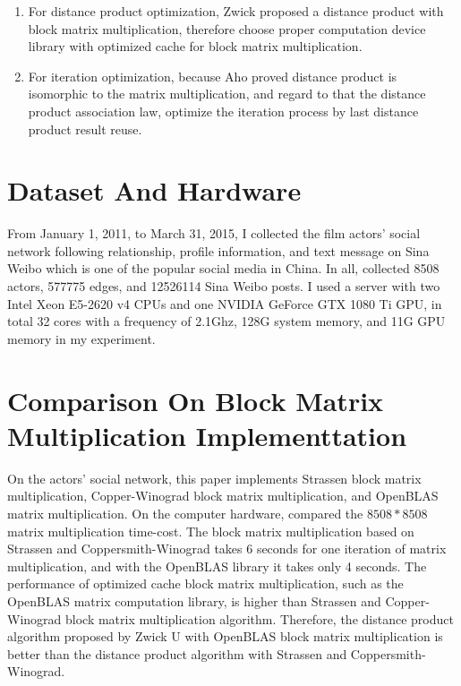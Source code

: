 \documentclass[review]{cvpr}
\begin{document}
\begin{enumerate}
\item For distance product optimization, Zwick proposed a distance product with block matrix multiplication, therefore choose proper computation device library with optimized cache for block matrix multiplication.
\item For iteration optimization, because Aho proved distance product is isomorphic to the matrix multiplication, and regard to that the distance product association law, optimize the iteration process by last distance product result reuse.
\end{enumerate}


\section{Dataset And Hardware}
From January 1, 2011, to March 31, 2015, I collected the film actors' social network following relationship, profile information, and text message on Sina Weibo which is one of the popular social media in China.
In all, collected 8508 actors, 577775 edges, and 12526114 Sina Weibo posts.
I used a server with two Intel Xeon E5-2620 v4 CPUs and one NVIDIA GeForce GTX 1080 Ti GPU, in total 32 cores with a frequency of 2.1Ghz, 128G system memory, and 11G GPU memory in my experiment.



\section{Comparison On Block Matrix Multiplication Implementtation}

On the actors' social network, this paper implements Strassen block matrix multiplication, Copper-Winograd block matrix multiplication, and OpenBLAS matrix multiplication.
On the computer hardware, compared the $8508*8508$ matrix multiplication time-cost.
The block matrix multiplication based on Strassen and Coppersmith-Winograd takes 6 seconds for one iteration of matrix multiplication, and with the OpenBLAS library it takes only 4 seconds.
The performance of optimized cache block matrix multiplication, such as the OpenBLAS matrix computation library, is higher than Strassen and Copper-Winograd block matrix multiplication algorithm.
Therefore, the distance product algorithm proposed by Zwick U with OpenBLAS block matrix multiplication is better than the distance product algorithm with Strassen and Coppersmith-Winograd.
\end{document}

